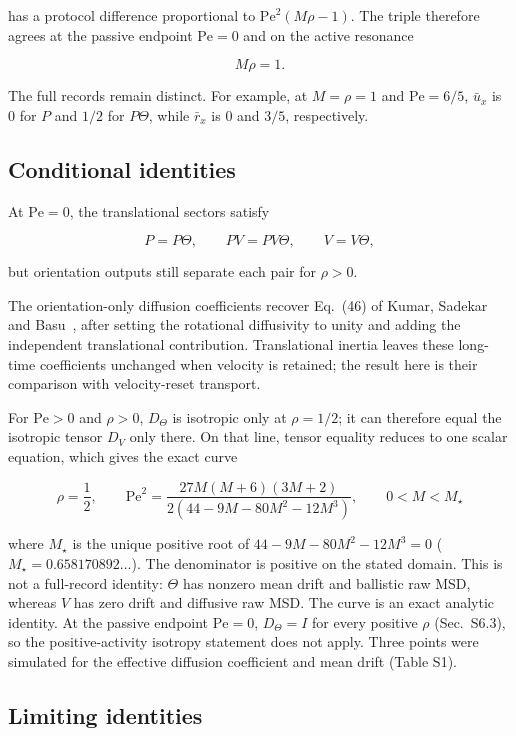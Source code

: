 has a protocol difference proportional to \(\mathrm{Pe}^2(M\rho-1)\). The triple therefore agrees at the passive endpoint \(\mathrm{Pe}=0\) and on the active resonance

\[
\boxed{M\rho=1.}
\]

The full records remain distinct. For example, at \(M=\rho=1\) and \(\mathrm{Pe}=6/5\), \(\bar u_x\) is \(0\) for \(P\) and \(1/2\) for \(P\Theta\), while \(\bar r_x\) is \(0\) and \(3/5\), respectively.

\subsection{Conditional identities}\label{s5.4-conditional-identities}

At \(\mathrm{Pe}=0\), the translational sectors satisfy

\[
P=P\Theta,\qquad
PV=PV\Theta,\qquad
V=V\Theta,
\]

but orientation outputs still separate each pair for \(\rho>0\).

The orientation-only diffusion coefficients recover Eq.~(46) of Kumar, Sadekar and Basu~\cite{KumarSadekarBasu}, after setting the rotational diffusivity to unity and adding the independent translational contribution. Translational inertia leaves these long-time coefficients unchanged when velocity is retained; the result here is their comparison with velocity-reset transport.

For \(\mathrm{Pe}>0\) and \(\rho>0\), \(D_\Theta\) is isotropic only at \(\rho=1/2\); it can therefore equal the isotropic tensor \(D_V\) only there. On that line, tensor equality reduces to one scalar equation, which gives the exact curve

\[
\boxed{
\rho=\frac12,\qquad
\mathrm{Pe}^2=
\frac{27M(M+6)(3M+2)}
{2(44-9M-80M^2-12M^3)},\qquad
0<M<M_\star
}
\]

where \(M_\star\) is the unique positive root of \(44-9M-80M^2-12M^3=0\) (\(M_\star=0.658170892\ldots\)). The denominator is positive on the stated domain. This is not a full-record identity: \(\Theta\) has nonzero mean drift and ballistic raw MSD, whereas \(V\) has zero drift and diffusive raw MSD. The curve is an exact analytic identity. At the passive endpoint \(\mathrm{Pe}=0\), \(D_\Theta=I\) for every positive \(\rho\) (Sec.~S6.3), so the positive-activity isotropy statement does not apply. Three points were simulated for the effective diffusion coefficient and mean drift (Table S1).

\subsection{Limiting identities}\label{s5.5-limiting-identities}

